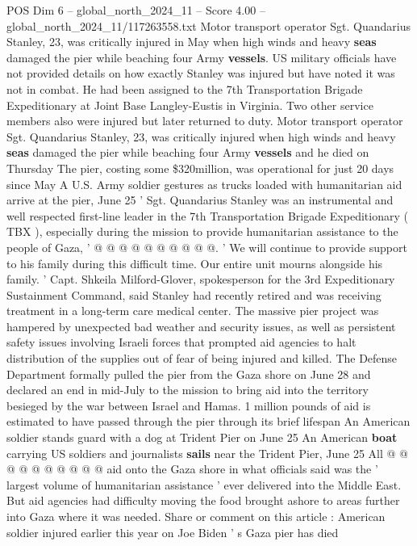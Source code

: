 \begin{textsample}{POS Dim 6 – global\_north\_2024\_11 – Score 4.00 – global\_north\_2024\_11/117263558.txt}  \label{ex:f6_pos_353}
Motor transport operator Sgt.
Quandarius Stanley, 23, was critically injured in May when high winds and heavy \textbf{seas} damaged the pier while beaching four Army \textbf{vessels}.
US military officials have not provided details on how exactly Stanley was injured but have noted it was not in combat.
He had been assigned to the 7th Transportation Brigade Expeditionary at Joint Base Langley-Eustis in Virginia.
Two other service members also were injured but later returned to duty.
Motor transport operator Sgt.
Quandarius Stanley, 23, was critically injured when high winds and heavy \textbf{seas} damaged the pier while beaching four Army \textbf{vessels} and he died on Thursday The pier, costing some \$320million, was operational for just 20 days since May A U.S.
Army soldier gestures as trucks loaded with humanitarian aid arrive at the pier, June 25 ' Sgt.
Quandarius Stanley was an instrumental and well respected first-line leader in the 7th Transportation Brigade Expeditionary ( TBX ), especially during the mission to provide humanitarian assistance to the people of Gaza, ' @ @ @ @ @ @ @ @ @ @. ' We will continue to provide support to his family during this difficult time.
Our entire unit mourns alongside his family. ' Capt.
Shkeila Milford-Glover, spokesperson for the 3rd Expeditionary Sustainment Command, said Stanley had recently retired and was receiving treatment in a long-term care medical center.
The massive pier project was hampered by unexpected bad weather and security issues, as well as persistent safety issues involving Israeli forces that prompted aid agencies to halt distribution of the supplies out of fear of being injured and killed.
The Defense Department formally pulled the pier from the Gaza shore on June 28 and declared an end in mid-July to the mission to bring aid into the territory besieged by the war between Israel and Hamas. 1 million pounds of aid is estimated to have passed through the pier through its brief lifespan An American soldier stands guard with a dog at Trident Pier on June 25 An American \textbf{boat} carrying US soldiers and journalists \textbf{sails} near the Trident Pier, June 25 All @ @ @ @ @ @ @ @ @ @ aid onto the Gaza shore in what officials said was the ' largest volume of humanitarian assistance ' ever delivered into the Middle East.
But aid agencies had difficulty moving the food brought ashore to areas further into Gaza where it was needed.
Share or comment on this article : American soldier injured earlier this year on Joe Biden ' s Gaza pier has died

\end{textsample}
